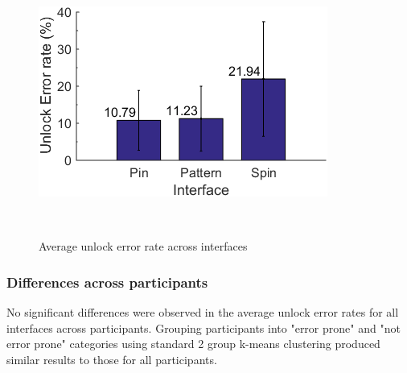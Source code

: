\documentclass{sigchi}
\begin{document}
\begin{figure}[h]
  \centering
  \includegraphics[width=0.7\columnwidth]{figures/analysis_1_interface_error_rate_bar.png}
  \caption{Average unlock error rate across interfaces}~\label{fig:unlock_error_rate_bar}
\end{figure}

\subsubsection{Differences across participants}
No significant differences were observed in the average unlock error rates for all interfaces across participants. Grouping participants into "error prone" and "not error prone" categories using standard 2 group k-means clustering produced similar results to those for all participants. 
\end{document}

